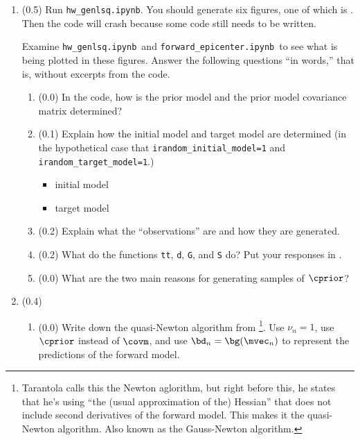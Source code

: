 \documentclass[11pt,titlepage,fleqn]{article}
\newcommand{\tfile}{{\tt hw\_genlsq.ipynb}}
\newcommand{\tfileFE}{{\tt forward\_epicenter.ipynb}}
\begin{document}
\begin{enumerate}
\item (0.5)
Run \tfile.
You should generate six figures, one of which is . Then the code will crash because some code still needs to be written.

Examine \tfile\ and \tfileFE\ to see what is being plotted in these figures. Answer the following questions ``in words,'' that is, without excerpts from the code.

\begin{enumerate}
\item (0.0) In the code, how is the prior model and the prior model covariance matrix determined?

\vspace{1cm}

\item (0.1) Explain how the initial model and target model are determined (in the hypothetical case that \verb+irandom_initial_model=1+ and \verb+irandom_target_model=1+.)

\begin{itemize}
\item initial model
\item target model
\end{itemize}

\item (0.2) Explain what the ``observations'' are and how they are generated.

\vspace{1cm}

\item (0.2) What do the functions \verb+tt+, \verb+d+, \verb+G+, and \verb+S+ do? Put your responses in .

\item (0.0) What are the two main reasons for generating samples of $\cprior$?

\vspace{1cm}

\end{enumerate}



\item (0.4) 

\begin{enumerate}
\item (0.0) Write down the quasi-Newton algorithm from \citet[][Eq.~6.319]{Tarantola2005}\footnote{Tarantola calls this the Newton aglorithm, but right before this, he states that he's using ``the (usual approximation of the) Hessian'' that does not include second derivatives of the forward model. This makes it the quasi-Newton algorithm. Also known as the Gauss-Newton algorithm.}. Use $\nu_n = 1$, use $\cprior$ instead of $\covm$, and use $\bd_n = \bg(\mvec_n)$ to represent the predictions of the forward model.


\end{enumerate}
\end{enumerate}
\end{document}
